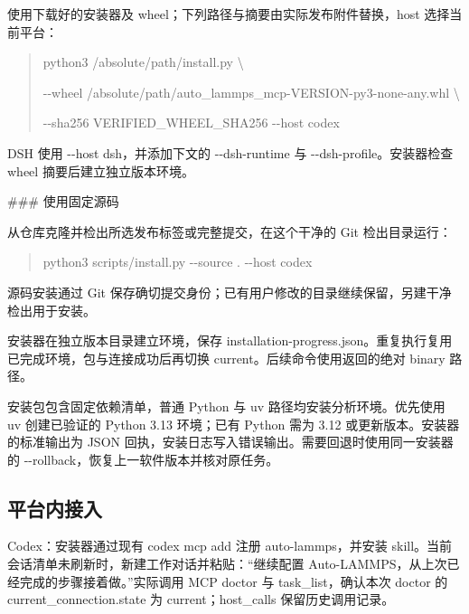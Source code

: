 \documentclass[11pt,a4paper]{ctexart}
\begin{document}
使用下载好的安装器及 wheel；下列路径与摘要由实际发布附件替换，host 选择当前平台：



\begin{quote}\small
python3 /\allowbreak{}absolute/\allowbreak{}path/\allowbreak{}install.py \textbackslash{}\par
  -{}-wheel /\allowbreak{}absolute/\allowbreak{}path/\allowbreak{}auto\_\allowbreak{}lammps\_\allowbreak{}mcp-VERSION-py3-none-any.whl \textbackslash{}\par
  -{}-sha256 VERIFIED\_\allowbreak{}WHEEL\_\allowbreak{}SHA256 -{}-host codex\par
\end{quote}


DSH 使用 -{}-host dsh，并添加下文的 -{}-dsh-runtime 与 -{}-dsh-profile。安装器检查 wheel 摘要后建立独立版本环境。



\#\#\# 使用固定源码



从仓库克隆并检出所选发布标签或完整提交，在这个干净的 Git 检出目录运行：



\begin{quote}\small
python3 scripts/\allowbreak{}install.py -{}-source . -{}-host codex\par
\end{quote}


源码安装通过 Git 保存确切提交身份；已有用户修改的目录继续保留，另建干净检出用于安装。



安装器在独立版本目录建立环境，保存 installation-progress.json。重复执行复用已完成环境，包与连接成功后再切换 current。后续命令使用返回的绝对 binary 路径。



安装包包含固定依赖清单，普通 Python 与 uv 路径均安装分析环境。优先使用 uv 创建已验证的 Python 3.13 环境；已有 Python 需为 3.12 或更新版本。安装器的标准输出为 JSON 回执，安装日志写入错误输出。需要回退时使用同一安装器的 -{}-rollback，恢复上一软件版本并核对原任务。



\subsection{平台内接入}


Codex：安装器通过现有 codex mcp add 注册 auto-lammps，并安装 skill。当前会话清单未刷新时，新建工作对话并粘贴：“继续配置 Auto-LAMMPS，从上次已经完成的步骤接着做。”实际调用 MCP doctor 与 task\_\allowbreak{}list，确认本次 doctor 的 current\_\allowbreak{}connection.state 为 current；host\_\allowbreak{}calls 保留历史调用记录。
\end{document}
